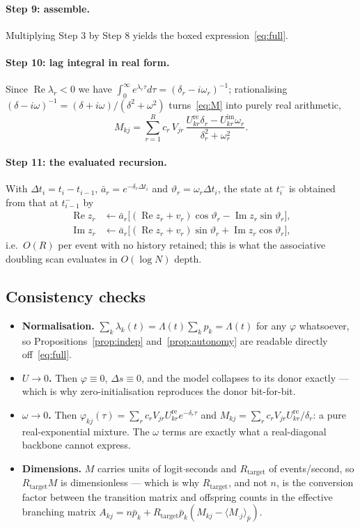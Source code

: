 \documentclass[11pt]{article}
\theoremstyle{remark}
\newcommand{\Real}{\operatorname{Re}}
\newcommand{\Imag}{\operatorname{Im}}
\newcommand{\Rtar}{R_{\mathrm{target}}}
\begin{document}
\paragraph{Step 9: assemble.}
Multiplying Step 3 by Step 8 yields the boxed
expression~\eqref{eq:full}.

\paragraph{Step 10: lag integral in real form.}
Since $\Real\lambda_r<0$ we have
$\int_0^\infty e^{\lambda_r\tau}d\tau=(\delta_r-i\omega_r)^{-1}$; rationalising
$(\delta-i\omega)^{-1}=(\delta+i\omega)/(\delta^2+\omega^2)$ turns~\eqref{eq:M}
into purely real arithmetic,
\[
M_{kj}=\sum_{r=1}^{R}c_r\,V_{jr}\,
\frac{U^{\mathrm{re}}_{kr}\delta_r-U^{\mathrm{im}}_{kr}\omega_r}
{\delta_r^{2}+\omega_r^{2}} .
\]

\paragraph{Step 11: the evaluated recursion.}
With $\Delta t_i=t_i-t_{i-1}$, $\bar a_r=e^{-\delta_r\Delta t_i}$ and
$\vartheta_r=\omega_r\Delta t_i$, the state at $t_i^-$ is obtained from that at
$t_{i-1}^-$ by
\[
\begin{aligned}
\Real z_r&\leftarrow \bar a_r\big[(\Real z_r+v_r)\cos\vartheta_r-\Imag z_r\sin\vartheta_r\big],\\
\Imag z_r&\leftarrow \bar a_r\big[(\Real z_r+v_r)\sin\vartheta_r+\Imag z_r\cos\vartheta_r\big],
\end{aligned}
\]
i.e.\ $O(R)$ per event with no history retained; this is what the associative
doubling scan evaluates in $O(\log N)$ depth.

\subsection*{Consistency checks}

\begin{itemize}
\item \textbf{Normalisation.} $\sum_k\lambda_k(t)=\Lambda(t)\sum_k p_k=\Lambda(t)$
for any $\varphi$ whatsoever, so Propositions~\ref{prop:indep}
and~\ref{prop:autonomy} are readable directly off~\eqref{eq:full}.
\item \textbf{$U\to0$.} Then $\varphi\equiv0$, $\Delta s\equiv0$, and the model
collapses to its donor exactly --- which is why zero-initialisation reproduces
the donor bit-for-bit.
\item \textbf{$\omega\to0$.} Then
$\varphi_{kj}(\tau)=\sum_r c_r V_{jr}U^{\mathrm{re}}_{kr}e^{-\delta_r\tau}$ and
$M_{kj}=\sum_r c_r V_{jr}U^{\mathrm{re}}_{kr}/\delta_r$: a pure real-exponential
mixture. The $\omega$ terms are exactly what a real-diagonal backbone cannot
express.
\item \textbf{Dimensions.} $M$ carries units of logit$\cdot$seconds and $\Rtar$
of events/second, so $\Rtar M$ is dimensionless --- which is why $\Rtar$, and not
$n$, is the conversion factor between the transition matrix and offspring counts
in the effective branching matrix $A_{kj}=n\bar p_k+\Rtar\bar p_k(M_{kj}-\langle
M_{\cdot j}\rangle_{\bar p})$.
\end{itemize}
\end{document}
